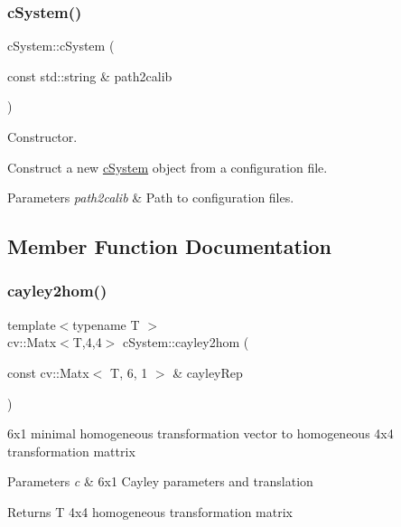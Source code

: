 \subsubsection{\texorpdfstring{c\+System()}{cSystem()}\hspace{0.1cm}{\footnotesize\ttfamily [2/2]}}
{\footnotesize\ttfamily c\+System\+::c\+System (\begin{DoxyParamCaption}\item[{const std\+::string \&}]{path2calib }\end{DoxyParamCaption})}



Constructor. 

Construct a new \hyperlink{classcSystem}{c\+System} object from a configuration file. 
\begin{DoxyParams}{Parameters}
{\em path2calib} & Path to configuration files. \\
\hline
\end{DoxyParams}


\subsection{Member Function Documentation}
\mbox{\label{classcSystem_ad08b05bd8f360a671094b7ab6a1b08db}} 
\subsubsection{\texorpdfstring{cayley2hom()}{cayley2hom()}}
{\footnotesize\ttfamily template$<$typename T $>$ \\
cv\+::\+Matx$<$T,4,4$>$ c\+System\+::cayley2hom (\begin{DoxyParamCaption}\item[{const cv\+::\+Matx$<$ T, 6, 1 $>$ \&}]{cayley\+Rep }\end{DoxyParamCaption})\hspace{0.3cm}{\ttfamily [inline]}}

6x1 minimal homogeneous transformation vector to homogeneous 4x4 transformation mattrix 
\begin{DoxyParams}{Parameters}
{\em c} & 6x1 Cayley parameters and translation \\
\hline
\end{DoxyParams}
\begin{DoxyReturn}{Returns}
T 4x4 homogeneous transformation matrix 
\end{DoxyReturn}
\mbox{\label{classcSystem_aaa6ff4626fafe84a7c0e3d9d892500cf}} 
